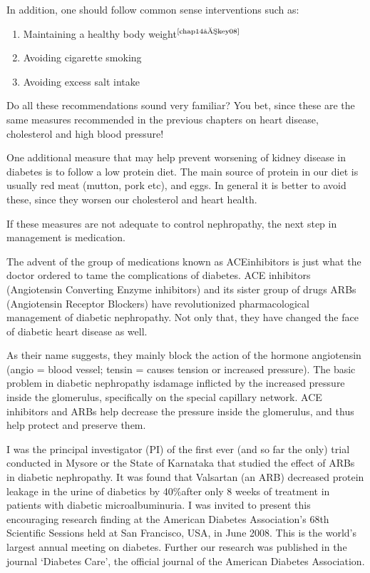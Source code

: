 In addition, one should follow common sense interventions such as:

\begin{enumerate}[•]
\itemsep=0pt
\item Maintaining a healthy body weight$^{\text{\cite{chap14–key08}}}$
\item Avoiding cigarette smoking
\item Avoiding excess salt intake
\end{enumerate}

Do all these recommendations sound very familiar? You bet, since these are the same measures recommended in the previous chapters on heart disease, cholesterol and high blood pressure!

One additional measure that may help prevent worsening of kidney disease in diabetes is to follow a low protein diet. The main source of protein in our diet is usually red meat (mutton, pork etc), and eggs. In general it is better to avoid these, since they worsen our cholesterol and heart health.

If these measures are not adequate to control nephropathy, the next step in management is medication.


The advent of the group of medications known as ACE\break inhibitors is just what the doctor ordered to tame the complications of diabetes. ACE inhibitors (Angiotensin Converting Enzyme inhibitors) and its sister group of drugs ARBs (Angiotensin Receptor Blockers) have revolutionized pharmacological management of diabetic nephropathy. Not only that, they have changed the face of diabetic heart disease as well.

As their name suggests, they mainly block the action of the hormone angiotensin (angio = blood vessel; tensin = causes tension or increased pressure). The basic problem in diabetic nephropathy is\break damage inflicted by the increased pressure inside the glomerulus, spe\-cifically on the special capillary network. ACE inhibitors and ARBs help decrease the pressure inside the glomerulus, and thus help protect and preserve them.

I was the principal investigator (PI) of the first ever (and so far the only) trial conducted in Mysore or the State of Karnataka that studied the effect of ARBs in diabetic nephropathy. It was found that Valsartan (an ARB) decreased protein leakage in the urine of diabetics by 40\%\break after only 8 weeks of treatment in patients with diabetic microalbuminuria. I was invited to present this encouraging research finding at the American Diabetes Association’s 68th Scientific Sessions held at San Francisco, USA, in June 2008. This is the world’s largest annual meeting on diabetes. Further our research was published in the journal ‘Diabetes Care’, the official journal of the American Diabetes Association.

